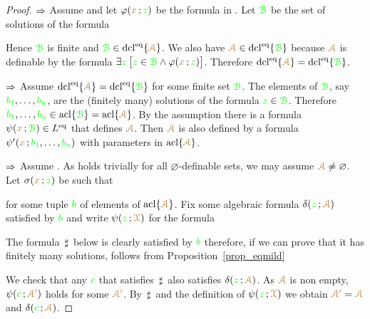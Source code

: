 
\begin{proof}
  $\IMP$ 
  Assume  and let $\phi({\mr x}\,;{\gr z})$ be the formula in .
  Let ${\gr\B}$ be the set of solutions of the formula


Hence ${\gr\B}$ is finite and ${\gr\B}\in\dcl^\eq\{{\vl\Aa}\}$.
We also have ${\vl\Aa}\in\dcl^\eq\{{\gr\B}\}$ because ${\vl\Aa}$ is definable by the formula $\E{\gr z}\,\big[{\gr z}\in {\gr\B}\wedge \phi({\mr x}\,;{\gr z})\big]$.
Therefore $\dcl^\eq\{{\vl\Aa}\}=\dcl^\eq\{{\gr\B}\}$.

$\IMP$ Assume $\dcl^\eq\{{\vl\Aa}\}=\dcl^\eq\{{\gr\B}\}$ for some finite set ${\gr\B}$.
The elements of ${\gr\B}$, say ${\gr b_1},\dots,{\gr b_n}$, are the (finitely many) solutions of the formula ${\gr z}\in{\gr\B}$.
Therefore ${\gr b_1},\dots,{\gr b_n}\in\acl\{{\gr\B}\}=\acl\{{\vl\Aa}\}$.
By the assumption there is a formula $\psi({\mr x}\,;{\gr\B})\in L^\eq$ that defines ${\vl\Aa}$.
Then ${\vl\Aa}$ is also defined by a formula $\psi'({\mr x}\,;{\gr b_1},\dots,{\gr b_n})$ with parameters in $\acl\{{\vl\Aa}\}$.

$\IMP$ Assume .
As  holds trivially for all $\varnothing$-definable sets, we may assume ${\vl\Aa}\neq\varnothing$.
Let $\sigma({\mr x}\,;{\gr z})$ be such that


for some tuple ${\gr b}$ of elements of $\acl\{{\vl\Aa}\}$.
Fix some algebraic formula $\delta({\gr z}\,;{\vl\Aa})$ satisfied by  ${\gr b}$ and write $\psi({\gr z}\,;{\vl\X})$ for the formula


The formula $\,\sharp\,$ below is clearly satisfied by ${\gr b}$ therefore, if we can prove that it has finitely many solutions,  follows from Proposition~\ref{prop_eqmild}


We check that any ${\gr c}$ that satisfies $\,\sharp\,$ also satisfies $\delta({\gr z}\,;{\vl\Aa})$.
As ${\vl\Aa}$ is non empty, $\psi({\gr c}\,;{\vl\Aa'})$ holds for some ${\vl\Aa'}$.
By $\,\sharp\,$ and the definition of $\psi({\gr z}\,;{\vl\X})$ we obtain ${\vl\Aa'}={\vl\Aa}$ and  $\delta({\gr c}\,;{\vl\Aa})$.
\end{proof}

